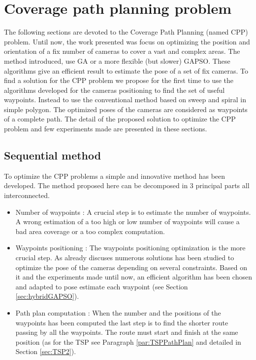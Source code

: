 \chapter{Coverage path planning problem} 


\minitoc

The following sections are devoted to the Coverage Path Planning  (named CPP) problem. Until now, the work presented was focus on optimizing the position and orientation of a fix number of cameras to cover a vast and complex areas. 
The method introduced, use GA or a more flexible (but slower) GAPSO. These algorithms give an efficient result to estimate the pose of a set of fix cameras. To find a solution for the CPP problem we propose for the first time to use the algorithms developed for the cameras positioning to find the set of useful waypoints. Instead to use the conventional method based on sweep and spiral in simple polygon. The optimized poses of the cameras are considered as waypoints of a complete path. 
The detail of the proposed solution to optimize the CPP problem and few experiments made are presented in these sections.
 

\section{Sequential method} \label{sec:CPPsequantielMethod}
To optimize the CPP problems a simple and innovative method has been developed. The method proposed here can be decomposed in 3 principal parts all interconnected. 
\begin{itemize}
	\item Number of waypoints : 
	A crucial step is to estimate the number of waypoints. A wrong estimation of a too high or low  number of waypoints will cause a bad area coverage or a too complex computation.
	\item Waypoints positioning : 
	The waypoints positioning optimization is the more crucial step. As already discuses numerous solutions has been studied to optimize the pose of the cameras depending on several constraints. Based on it and the experiments made until now, an efficient algorithm has been chosen and adapted to pose estimate each waypoint (see Section  \ref{sec:hybridGAPSO}). 
	\item  Path plan computation : 
	 When the number and the positions of the waypoints has been computed the last step is to find the shorter route  passing by all the waypoints. The route must start and finish at the same position (as for the TSP see Paragraph \ref{par:TSPPathPlan} and detailed in Section \ref{sec:TSP2}).
	
\end{itemize}


